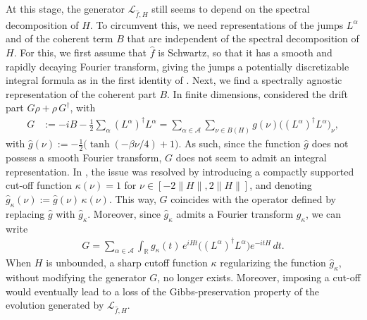 \documentclass[11pt]{amsart}
\newcommand{\1}{\mathbbm{1}}
\theoremstyle{plain}
\theoremstyle{definition}
\theoremstyle{remark}
\numberwithin{equation}{section}
\begin{document}
\noindent At this stage, the generator $\mathcal{L}_{\widehat{f},H}$ still seems to depend on the spectral decomposition of $H$. To circumvent this, we need representations of the jumps $L^\alpha$ and of the coherent term $B$ that are independent of the spectral decomposition of $H$. For this, we first 
 assume that $\widehat{f}$ is Schwartz, so that it has a smooth and rapidly decaying Fourier transform, giving the jumps a potentially discretizable integral formula as in the first identity of . Next, we find a spectrally agnostic representation of the coherent part $B$. In finite dimensions, \cite{ding2025efficient} considered the drift part $G\rho+\rho \,G^\dagger$, with 
\begin{align*}
G&:=-iB-\frac{1}{2}\sum_\alpha (L^\alpha)^\dagger L^\alpha  =\sum_{\alpha\in\mathcal{A}}\sum_{\nu\in B(H)}g(\nu)\big((L^\alpha)^\dagger L^\alpha\big)_\nu,
\end{align*}
with $\widehat{g}(\nu):=-\frac{1}{2}\big(\operatorname{tanh}(-\beta \nu/4)+1\big) $. As such, since the function $\widehat{g}$ does not possess a smooth Fourier transform, $G$ does not seem to admit an integral representation.
In \cite{ding2025efficient}, the issue was resolved by introducing a compactly supported cut-off function $\kappa(\nu)=1$ for $\nu\in [-2\|H\|,2\|H\|]$, and denoting 
$
\widehat{g}_\kappa(\nu):=\widehat{g}(\nu)\,\kappa(\nu).
$
This way, $G$ coincides with the operator defined by replacing $\widehat{g}$ with $\widehat{g}_\kappa$. Moreover, since $\widehat{g}_\kappa$ admits a Fourier transform $g_\kappa$, we can write
\begin{align*}
G=\sum_{\alpha\in \mathcal{A}}\int_{\mathbb{R}} g_\kappa(t) \,e^{iHt}\big((L^\alpha)^\dagger L^\alpha\big) e^{-itH}\,dt.
\end{align*}
When $H$ is unbounded, a sharp cutoff function $\kappa$ regularizing the function $\widehat{g}_\kappa$, without modifying the generator $G$, no longer exists. Moreover, imposing a cut-off would eventually lead to a loss of the Gibbs-preservation property of the evolution generated by $\mathcal{L}_{\widehat{f},H}$. 
\end{document}
